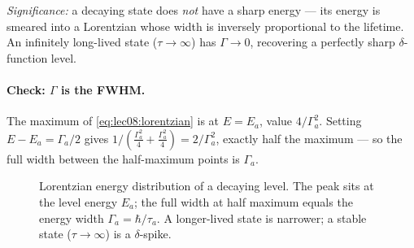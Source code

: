 \textit{Significance:} a decaying state does \emph{not} have a sharp energy ---
its energy is smeared into a Lorentzian whose width is inversely proportional to
the lifetime.  An infinitely long-lived state ($\tau\to\infty$) has
$\Gamma\to0$, recovering a perfectly sharp $\delta$-function level.

\paragraph{Check: $\Gamma$ is the FWHM.}
The maximum of \eqref{eq:lec08:lorentzian} is at $E=E_a$, value $4/\Gamma_a^2$.
Setting $E - E_a = \Gamma_a/2$ gives
$1/\!\left(\tfrac{\Gamma_a^2}{4}+\tfrac{\Gamma_a^2}{4}\right) = 2/\Gamma_a^2$,
exactly half the maximum --- so the full width between the half-maximum points is
$\Gamma_a$.

\begin{figure}[h]
\centering
{}
\caption{Lorentzian energy distribution of a decaying level.  The peak sits at
the level energy $E_a$; the full width at half maximum equals the energy width
$\Gamma_a = \hbar/\tau_a$.  A longer-lived state is narrower; a stable state
($\tau\to\infty$) is a $\delta$-spike.}
\label{fig:lec08:lorentzian}
\end{figure}

